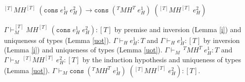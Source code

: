 \begin{case}
$^{[T]}MH^{[T]}\;(\mathtt{cons}\;e_{H}^{1}\;e_{H}^{2})\rightarrow\mathtt{cons}\;(^{T}MH^{T}\;e_{H}^{1})\;(^{[T]}MH^{[T]}\;e_{H}^{2})$

$\Gamma\vdash_{M}^{[T]}MH^{[T]}\;(\mathtt{cons}\;e_{H}^{1}\;e_{H}^{2}):[T]$ by premise and inversion (Lemma \ref{i}) and uniqueness of types (Lemma \ref{uot}).  $\Gamma\vdash_{H}e_{H}^{1}:T$ and $\Gamma\vdash_{H}e_{H}^{1}:[T]$ by inversion (Lemma \ref{i}) and uniqueness of types (Lemma \ref{uot}).  $\Gamma\vdash_{M}\,^{T}MH^{T}\;e_{H}^{1}:T$ and $\Gamma\vdash_{M}\,^{[T]}MH^{[T]}\;e_{H}^{2}:[T]$ by the induction hypothesis and uniqueness of types (Lemma \ref{uot}).  $\Gamma\vdash_{M}\mathtt{cons}\;(^{T}MH^{T}\;e_{H}^{1})\;(^{[T]}MH^{[T]}\;e_{H}^{2}):[T]$.
\end{case}